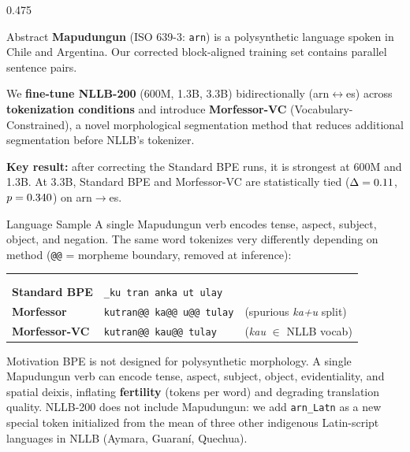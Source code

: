 \documentclass[final]{beamer}
\newcommand{\arnEs}{arn$\rightarrow$es}
\newcommand{\arnBoth}{arn$\leftrightarrow$es}
\newcommand{\boxsep}{\vspace{1.0em}}
\begin{document}
\begin{frame}[t]{}
\begin{columns}[t,totalwidth=\paperwidth]
\begin{column}{0.475\paperwidth}
\begin{introbox}{Abstract}
\textbf{Mapudungun} (ISO 639-3: \texttt{arn}) is a polysynthetic
language spoken in Chile and Argentina. Our corrected block-aligned training set
contains \TrainPairs{} parallel sentence pairs.

We \textbf{fine-tune NLLB-200} (600M, 1.3B, 3.3B) bidirectionally (\arnBoth)
across \textbf{\NConditions{} tokenization conditions} and introduce
\textbf{Morfessor-VC} (Vocabulary-Constrained), a novel morphological segmentation
method that reduces additional segmentation before NLLB's tokenizer.

\textbf{Key result:} after correcting the Standard BPE runs, it is strongest at
600M and 1.3B. At 3.3B, Standard BPE and Morfessor-VC are statistically tied
($\Delta=0.11$, $p=0.340$) on \arnEs{}.
\end{introbox}

\boxsep

\begin{sectionbox}{Language Sample}
A single Mapudungun verb encodes tense, aspect, subject, object, and
negation. The same word tokenizes very differently depending on method
(\texttt{@@} = morpheme boundary, removed at inference):

\vspace{0.4em}
\setlength{\tabcolsep}{7pt}
\renewcommand{\arraystretch}{1.3}
{\large
\begin{tabularx}{\linewidth}{>{\bfseries\color{byuNavy}}l l @{\hspace{1.5em}} l}
\multicolumn{3}{l}{\textit{kutrankautulay}: ``does not become sick''} \\[0.2em]
\multicolumn{3}{l}{kutran (illness) $+$ kautu (to become) $+$ -lay (negation)} \\[0.5em]
\hline\noalign{\vspace{3pt}}
Standard BPE  & \texttt{\_ku tran anka ut ulay} & \\[0.2em]
Morfessor     & \texttt{kutran@@ \textcolor{byuRoyal}{ka@@ u@@} tulay}
              & (spurious \textit{ka+u} split) \\[0.2em]
Morfessor-VC  & \texttt{kutran@@ \textcolor{byuOrange}{kau@@} tulay}
              & (\textit{kau} $\in$ NLLB vocab) \\
\end{tabularx}}
\end{sectionbox}

\boxsep

\begin{sectionbox}{Motivation}
BPE is not designed for polysynthetic morphology. A single Mapudungun
verb can encode tense, aspect, subject, object, evidentiality, and spatial deixis,
inflating \textbf{fertility} (tokens per word) and degrading translation quality.
NLLB-200 does not include Mapudungun: we add \texttt{arn\_Latn} as a new special
token initialized from the mean of three other indigenous Latin-script
languages in NLLB (Aymara, Guaran\'{i}, Quechua).


\end{sectionbox}
\end{column}
\end{columns}
\end{frame}
\end{document}
